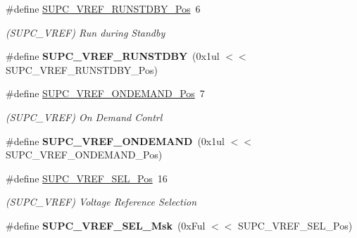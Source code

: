 \begin{DoxyCompactItemize}
\item 
\hypertarget{group___s_a_m_l21___s_u_p_c_ga718ae44121dcea1e98ba492001b73be7}{}\#define \hyperlink{group___s_a_m_l21___s_u_p_c_ga718ae44121dcea1e98ba492001b73be7}{S\+U\+P\+C\+\_\+\+V\+R\+E\+F\+\_\+\+R\+U\+N\+S\+T\+D\+B\+Y\+\_\+\+Pos}~6\label{group___s_a_m_l21___s_u_p_c_ga718ae44121dcea1e98ba492001b73be7}

\begin{DoxyCompactList}\small\item\em (S\+U\+P\+C\+\_\+\+V\+R\+E\+F) Run during Standby \end{DoxyCompactList}\item 
\hypertarget{group___s_a_m_l21___s_u_p_c_ga7f0442e396aaf1a1c8129cbb86ad259c}{}\#define {\bfseries S\+U\+P\+C\+\_\+\+V\+R\+E\+F\+\_\+\+R\+U\+N\+S\+T\+D\+B\+Y}~(0x1ul $<$$<$ S\+U\+P\+C\+\_\+\+V\+R\+E\+F\+\_\+\+R\+U\+N\+S\+T\+D\+B\+Y\+\_\+\+Pos)\label{group___s_a_m_l21___s_u_p_c_ga7f0442e396aaf1a1c8129cbb86ad259c}

\item 
\hypertarget{group___s_a_m_l21___s_u_p_c_gae1cb13ba7ba5f665fd6c50988ffda189}{}\#define \hyperlink{group___s_a_m_l21___s_u_p_c_gae1cb13ba7ba5f665fd6c50988ffda189}{S\+U\+P\+C\+\_\+\+V\+R\+E\+F\+\_\+\+O\+N\+D\+E\+M\+A\+N\+D\+\_\+\+Pos}~7\label{group___s_a_m_l21___s_u_p_c_gae1cb13ba7ba5f665fd6c50988ffda189}

\begin{DoxyCompactList}\small\item\em (S\+U\+P\+C\+\_\+\+V\+R\+E\+F) On Demand Contrl \end{DoxyCompactList}\item 
\hypertarget{group___s_a_m_l21___s_u_p_c_ga64e87db219eec84cf003f316d7c8d188}{}\#define {\bfseries S\+U\+P\+C\+\_\+\+V\+R\+E\+F\+\_\+\+O\+N\+D\+E\+M\+A\+N\+D}~(0x1ul $<$$<$ S\+U\+P\+C\+\_\+\+V\+R\+E\+F\+\_\+\+O\+N\+D\+E\+M\+A\+N\+D\+\_\+\+Pos)\label{group___s_a_m_l21___s_u_p_c_ga64e87db219eec84cf003f316d7c8d188}

\item 
\hypertarget{group___s_a_m_l21___s_u_p_c_gad4360a3a50810b54b6e54cc7685f7cf5}{}\#define \hyperlink{group___s_a_m_l21___s_u_p_c_gad4360a3a50810b54b6e54cc7685f7cf5}{S\+U\+P\+C\+\_\+\+V\+R\+E\+F\+\_\+\+S\+E\+L\+\_\+\+Pos}~16\label{group___s_a_m_l21___s_u_p_c_gad4360a3a50810b54b6e54cc7685f7cf5}

\begin{DoxyCompactList}\small\item\em (S\+U\+P\+C\+\_\+\+V\+R\+E\+F) Voltage Reference Selection \end{DoxyCompactList}\item 
\hypertarget{group___s_a_m_l21___s_u_p_c_gace0ce1ef32c4b91e9aafdf489f362d2c}{}\#define {\bfseries S\+U\+P\+C\+\_\+\+V\+R\+E\+F\+\_\+\+S\+E\+L\+\_\+\+Msk}~(0x\+Ful $<$$<$ S\+U\+P\+C\+\_\+\+V\+R\+E\+F\+\_\+\+S\+E\+L\+\_\+\+Pos)\label{group___s_a_m_l21___s_u_p_c_gace0ce1ef32c4b91e9aafdf489f362d2c}


\end{DoxyCompactItemize}
